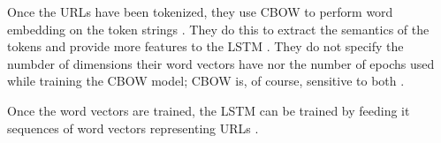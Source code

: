 Once the URLs have been tokenized, they use CBOW to perform word embedding on the token strings \cite{fang2018deepxss}. They do this to extract the semantics of the tokens and provide more features to the LSTM \cite{fang2018deepxss}. They do not specify the numbder of dimensions their word vectors have nor the number of epochs used while training the CBOW model; CBOW is, of course, sensitive to both \cite{mikolov2013efficient}.

Once the word vectors are trained, the LSTM can be trained by feeding it sequences of word vectors representing URLs \cite{fang2018deepxss}. 
